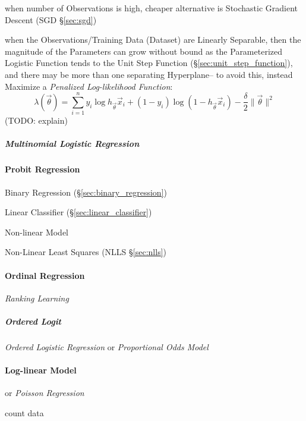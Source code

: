 when number of Observations is high, cheaper alternative is Stochastic Gradient
Descent (SGD \S\ref{sec:sgd})

when the Observations/Training Data (Dataset) are Linearly Separable, then the
magnitude of the Parameters can grow without bound as the Parameterized Logistic
Function tends to the Unit Step Function (\S\ref{sec:unit_step_function}), and
there may be more than one separating Hyperplane-- to avoid this, instead
Maximize a \emph{Penalized Log-likelihood Function}:
\[
  \lambda (\vec{\theta}) = \sum_{i=1}^n
    y_i \log h_{\vec{\theta}} \vec{x}_i
    + (1-y_i) \log (1 - h_{\vec{\theta}} \vec{x}_i)
    - \frac{\delta}{2} \|\vec{\theta}\|^2
\]
(TODO: explain)



\subparagraph{Multinomial Logistic Regression}
\label{sec:multinomial_regression}\hfill



\paragraph{Probit Regression}\label{sec:probit_regression}

Binary Regression (\S\ref{sec:binary_regression})

Linear Classifier (\S\ref{sec:linear_classifier})

Non-linear Model

Non-Linear Least Squares (NLLS \S\ref{sec:nlls})



\paragraph{Ordinal Regression}\label{sec:ordinal_regression}\hfill

\emph{Ranking Learning}



\subparagraph{Ordered Logit}\label{sec:ordered_logit}\hfill

\emph{Ordered Logistic Regression} or \emph{Proportional Odds Model}



\paragraph{Log-linear Model}\label{sec:log_linear}\hfill

or \emph{Poisson Regression}

count data

